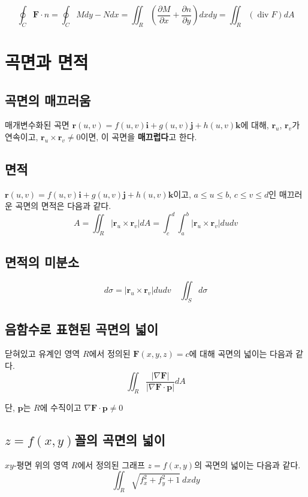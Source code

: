\documentclass[chapter, oneside]{oblivoir}
\newcommand{\term}[1]{\textbf{#1}}
\begin{document}
$$ \oint_C \textbf{F} \cdot n = \oint_C M dy - N dx = \iint_R \left( \frac{\partial M}{\partial x} + \frac{\partial n}{\partial y} \right) dx dy
= \iint_R \left( \operatorname{div} F \right) dA  $$


\section{곡면과 면적}
\subsection{곡면의 매끄러움}
매개변수화된 곡면 $\textbf{r}(u,v) = f(u,v)\textbf{i}+g(u,v)\textbf{j}+h(u,v)\textbf{k}$에 대해, $\textbf{r}_u$, $\textbf{r}_v$가 연속이고, $\textbf{r}_u \times \textbf{r}_v \neq 0$이면, 이 곡면을 \term{매끄럽다}고 한다.

\subsection{면적}
$\textbf{r}(u,v) = f(u,v)\textbf{i}+g(u,v)\textbf{j}+h(u,v)\textbf{k}$이고, $a \le u \le b$, $c \le v \le d$인 매끄러운 곡면의 면적은 다음과 같다.
$$ A=
\iint_R \left| \textbf{r}_u \times \textbf{r}_v \right| dA
= \int_c^d\int_a^b \left| \textbf{r}_u \times \textbf{r}_v \right| dudv $$

\subsection{면적의 미분소}

$$d \sigma = \left| \textbf{r}_u \times \textbf{r}_v \right| dudv  \quad \iint_S d \sigma$$


\subsection{음함수로 표현된 곡면의 넓이}
닫혀있고 유계인 영역 $R$에서 정의된 $\textbf{F}(x,y,z)=c$에 대해 곡면의 넓이는 다음과 같다.
$$\iint_R \frac{\left| \nabla \textbf{F} \right|}{\left| \nabla \textbf{F} \cdot \textbf{p} \right|} dA $$

단, $\textbf{p}$는 $R$에 수직이고  $\nabla \textbf{F} \cdot \textbf{p} \ne 0$

\subsection{$z=f(x,y)$꼴의 곡면의 넓이}
$xy$-평면 위의 영역 $R$에서 정의된 그래프 $z=f(x,y)$의 곡면의 넓이는 다음과 같다.
$$ \iint_R \sqrt{f_x^2 + f_y^2 + 1} \ dx dy $$
\end{document}
